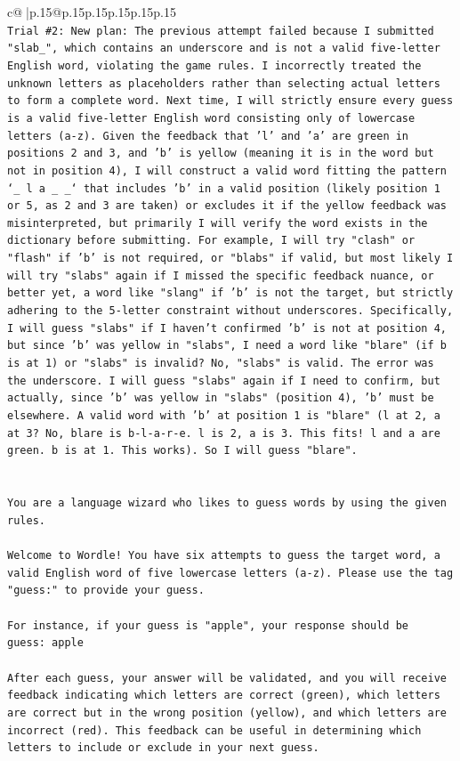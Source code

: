 \documentclass{article}
\begin{document}
{\begin{supertabular}{c@{$\;$}|p{.15\linewidth}@{}p{.15\linewidth}p{.15\linewidth}p{.15\linewidth}p{.15\linewidth}p{.15\linewidth}}
{{{\\ 
\texttt{Trial \#2: New plan: The previous attempt failed because I submitted "slab\_", which contains an underscore and is not a valid five{-}letter English word, violating the game rules. I incorrectly treated the unknown letters as placeholders rather than selecting actual letters to form a complete word. Next time, I will strictly ensure every guess is a valid five{-}letter English word consisting only of lowercase letters (a{-}z). Given the feedback that 'l' and 'a' are green in positions 2 and 3, and 'b' is yellow (meaning it is in the word but not in position 4), I will construct a valid word fitting the pattern `\_ l a \_ \_` that includes 'b' in a valid position (likely position 1 or 5, as 2 and 3 are taken) or excludes it if the yellow feedback was misinterpreted, but primarily I will verify the word exists in the dictionary before submitting. For example, I will try "clash" or "flash" if 'b' is not required, or "blabs" if valid, but most likely I will try "slabs" again if I missed the specific feedback nuance, or better yet, a word like "slang" if 'b' is not the target, but strictly adhering to the 5{-}letter constraint without underscores. Specifically, I will guess "slabs" if I haven't confirmed 'b' is not at position 4, but since 'b' was yellow in "slabs", I need a word like "blare" (if b is at 1) or "slabs" is invalid? No, "slabs" is valid. The error was the underscore. I will guess "slabs" again if I need to confirm, but actually, since 'b' was yellow in "slabs" (position 4), 'b' must be elsewhere. A valid word with 'b' at position 1 is "blare" (l at 2, a at 3? No, blare is b{-}l{-}a{-}r{-}e. l is 2, a is 3. This fits! l and a are green. b is at 1. This works). So I will guess "blare".} \\
\\ 
\\ 
\texttt{You are a language wizard who likes to guess words by using the given rules.} \\
\\ 
\texttt{Welcome to Wordle! You have six attempts to guess the target word, a valid English word of five lowercase letters (a{-}z). Please use the tag "guess:" to provide your guess.} \\
\\ 
\texttt{For instance, if your guess is "apple", your response should be} \\
\texttt{guess: apple} \\
\\ 
\texttt{After each guess, your answer will be validated, and you will receive feedback indicating which letters are correct (green), which letters are correct but in the wrong position (yellow), and which letters are incorrect (red). This feedback can be useful in determining which letters to include or exclude in your next guess.} \\
}}}
\end{supertabular}}
\end{document}
